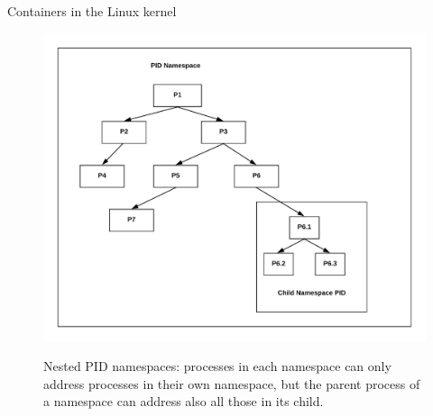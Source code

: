 \begin{frame}{Containers in the Linux kernel}
	\begin{figure}
		\centering
		\includegraphics[scale=.125]{pidNamespace.png}
		\label{fig:pidnamespace}
		\caption{Nested PID namespaces: processes in each namespace can only address processes in their own namespace, but the parent process of a namespace can address also all those in its child.}
	\end{figure}
\end{frame}
